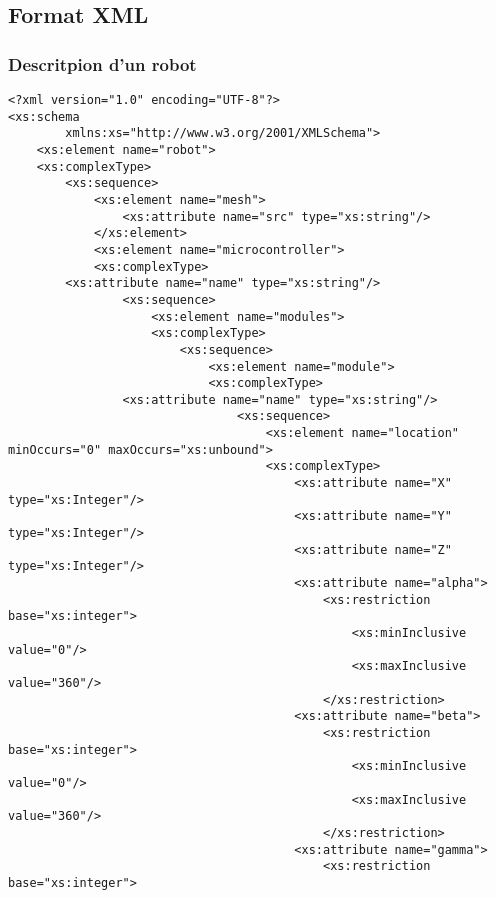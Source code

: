 \subsection{Format XML}
\subsubsection{Descritpion d'un robot}
\begin{changemargin}{-1cm}{-1cm}
\begin{lstlisting}[caption=Description du Robot, label=descbot]
<?xml version="1.0" encoding="UTF-8"?>
<xs:schema
        xmlns:xs="http://www.w3.org/2001/XMLSchema">
    <xs:element name="robot">
    <xs:complexType>
        <xs:sequence>
            <xs:element name="mesh">
                <xs:attribute name="src" type="xs:string"/>
            </xs:element>
            <xs:element name="microcontroller">
            <xs:complexType>
		<xs:attribute name="name" type="xs:string"/>
                <xs:sequence>
                    <xs:element name="modules">
                    <xs:complexType>
                        <xs:sequence>
                            <xs:element name="module">
                            <xs:complexType>
				<xs:attribute name="name" type="xs:string"/>
                                <xs:sequence>
                                    <xs:element name="location" minOccurs="0" maxOccurs="xs:unbound">
                                    <xs:complexType>
                                        <xs:attribute name="X" type="xs:Integer"/>
                                        <xs:attribute name="Y" type="xs:Integer"/>
                                        <xs:attribute name="Z" type="xs:Integer"/>
                                        <xs:attribute name="alpha">
                                            <xs:restriction base="xs:integer">
                                                <xs:minInclusive value="0"/>
                                                <xs:maxInclusive value="360"/>
                                            </xs:restriction> 
                                        <xs:attribute name="beta">
                                            <xs:restriction base="xs:integer">
                                                <xs:minInclusive value="0"/>
                                                <xs:maxInclusive value="360"/>
                                            </xs:restriction>
                                        <xs:attribute name="gamma">
                                            <xs:restriction base="xs:integer">

\end{lstlisting}
\end{changemargin}
